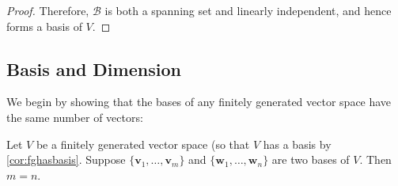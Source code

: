 \begin{proof}
    Therefore, $\mathcal{B}$ is both a spanning set and linearly independent, and hence forms a basis of $V$.
\end{proof}


\subsection{Basis and Dimension}

We begin by showing that the bases of any finitely generated vector space have the same number of vectors:

\begin{theorem} \label{thm:basisdim}
Let $V$ be a finitely generated vector space (so that $V$ has a basis by \autoref{cor:fghasbasis}. Suppose $\{ \mathbf{v}_1,\ldots, \mathbf{v}_{m} \}$ and $\{ \mathbf{w}_1,\ldots, \mathbf{w}_n \}$ are two bases of $V$. Then $m = n$.
\end{theorem}

